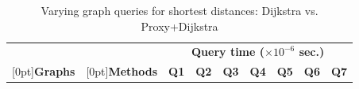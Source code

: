\begin{table}[t!]
\caption{Varying graph queries  for shortest distances: Dijkstra  vs. Proxy+Dijkstra}\label{tab:performance_dist_queries_dj}
\vspace{-2ex}
\begin{center}

\begin{tabular}{|c|c||r|r|r|r|r|r|r|}
\hline
  &   & \multicolumn{7}{c|}{\bf Query time ($\times 10^{-6}$ sec.)} \\
\cline{3-9}

\raisebox{1.5ex}[0pt]{\bf Graphs} & \raisebox{1.5ex}[0pt]{\bf Methods} & {\bf Q1} & {\bf Q2} & {\bf Q3} & {\bf Q4} & {\bf Q5} & {\bf Q6} & {\bf Q7}  \\ \hline \hline


\end{tabular}
\end{center}
\end{table}
